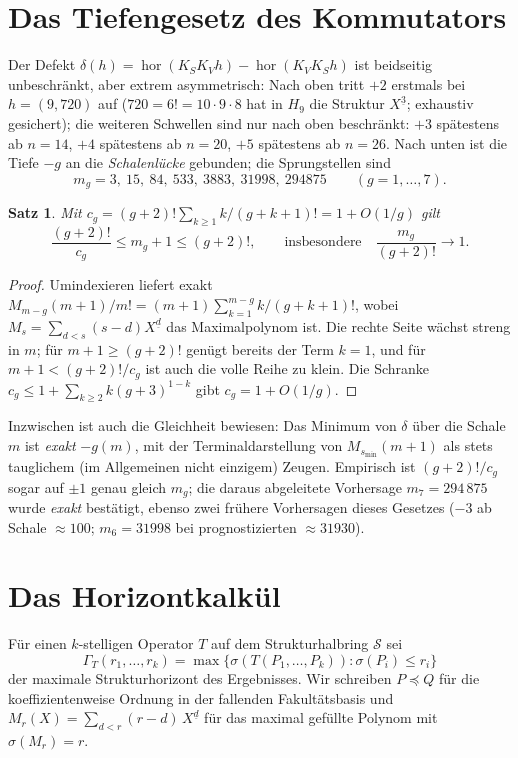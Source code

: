 \documentclass[11pt]{article}
\newtheorem{satz}{Satz}[section]
\theoremstyle{definition}
\theoremstyle{remark}
\newcommand{\Struk}{\mathcal S}
\newcommand{\ff}[2]{#1^{\underline{#2}}}
\newcommand{\KV}{K_V}
\newcommand{\KS}{K_S}
\begin{document}
\section{Das Tiefengesetz des Kommutators}

Der Defekt
$\delta(h)=\operatorname{hor}(\KS\KV h)-\operatorname{hor}(\KV\KS h)$
ist beidseitig unbeschränkt, aber extrem asymmetrisch: Nach oben
tritt $+2$ erstmals bei $h=(9,720)$ auf ($720=6!=10\cdot9\cdot8$ hat
in $H_9$ die Struktur $\ff X3$; exhaustiv gesichert); die weiteren
Schwellen sind nur nach oben beschränkt: $+3$ spätestens ab $n=14$,
$+4$ spätestens ab $n=20$, $+5$ spätestens ab $n=26$.
Nach unten ist die Tiefe $-g$ an die \emph{Schalenlücke} gebunden;
die Sprungstellen sind
\[
m_g=3,\ 15,\ 84,\ 533,\ 3883,\ 31998,\ 294875\qquad(g=1,\dots,7).
\]

\begin{satz}\label{satz:asymptotik}
Mit $c_g=(g{+}2)!\sum_{k\ge1}k/(g{+}k{+}1)!=1+O(1/g)$ gilt
\[
\frac{(g+2)!}{c_g}\le m_g+1\le(g+2)!,
\qquad\text{insbesondere}\quad
\frac{m_g}{(g+2)!}\to1 .
\]
\end{satz}

\begin{proof}
Umindexieren liefert exakt
$M_{m-g}(m{+}1)/m!=(m{+}1)\sum_{k=1}^{m-g}k/(g{+}k{+}1)!$, wobei
$M_s=\sum_{d<s}(s{-}d)\ff Xd$ das Maximalpolynom ist. Die rechte
Seite wächst streng in $m$; für $m{+}1\ge(g{+}2)!$ genügt bereits
der Term $k{=}1$, und für $m{+}1<(g{+}2)!/c_g$ ist auch die volle
Reihe zu klein. Die Schranke $c_g\le1+\sum_{k\ge2}k(g{+}3)^{1-k}$
gibt $c_g=1+O(1/g)$.
\end{proof}

Inzwischen ist auch die Gleichheit bewiesen: Das Minimum von
$\delta$ über die Schale $m$ ist \emph{exakt} $-g(m)$, mit der
Terminaldarstellung von $M_{s_{\min}}(m{+}1)$ als stets tauglichem
(im Allgemeinen nicht einzigem) Zeugen.
Empirisch ist $(g{+}2)!/c_g$ sogar auf $\pm1$ genau gleich $m_g$;
die daraus abgeleitete Vorhersage $m_7=294\,875$ wurde
\emph{exakt} bestätigt, ebenso zwei frühere Vorhersagen dieses
Gesetzes ($-3$ ab Schale ${\approx}100$; $m_6=31998$ bei
prognostizierten ${\approx}31930$).

\section{Das Horizontkalkül}

Für einen $k$-stelligen Operator $T$ auf dem Strukturhalbring
$\Struk$ sei
\[
\Gamma_T(r_1,\ldots,r_k)=\max\{\sigma(T(P_1,\ldots,P_k)):
\sigma(P_i)\le r_i\}
\]
der maximale Strukturhorizont des Ergebnisses.
Wir schreiben $P\preceq Q$ für die koeffizientenweise Ordnung in der
fallenden Fakultätsbasis und
$M_r(X)=\sum_{d<r}(r{-}d)\,\ff Xd$ für das maximal gefüllte Polynom
mit $\sigma(M_r)=r$.
\end{document}
